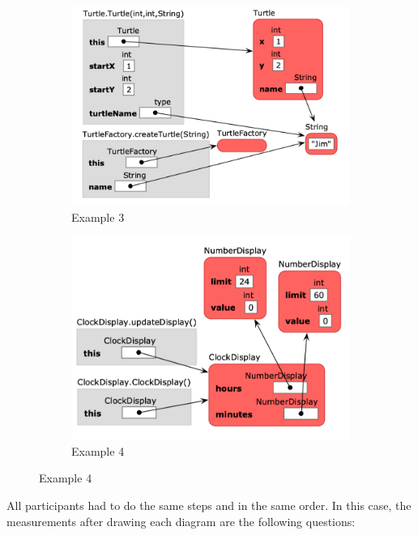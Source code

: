 \documentclass[]{usiinfbachelorproject}
\begin{document}
\begin{figure}[h!]
\centering
\begin{subfigure}{.5\textwidth}
  \centering
  \includegraphics[width=\textwidth-10pt]{figures/informa_clicker_example3.png}
  \caption{Example 3}
  \label{fig:sub1}
\end{subfigure}%
\begin{subfigure}{.5\textwidth}
  \centering
  \includegraphics[width=\textwidth-10pt]{figures/informa_clicker_example4.png}
  \caption{Example 4}
  \label{fig:sub2}
\end{subfigure}
\label{fig:test}
\end{figure}

\bigskip

\noindent All participants had to do the same steps and in the same order. In this case, the measurements after drawing each diagram are the following questions:
\end{document}
